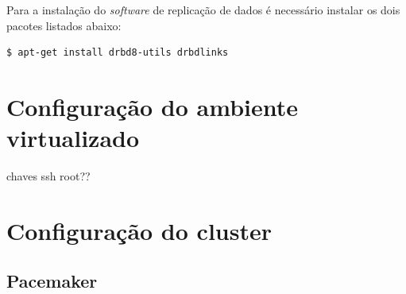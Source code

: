 Para a instalação do \textit{software} de replicação de dados é necessário instalar os dois pacotes listados abaixo:
\begin{lstlisting}[language=bash]
 $ apt-get install drbd8-utils drbdlinks
\end{lstlisting}

\section{Configuração do ambiente virtualizado}

chaves ssh root??

\section{Configuração do cluster}


\subsection{Pacemaker}

